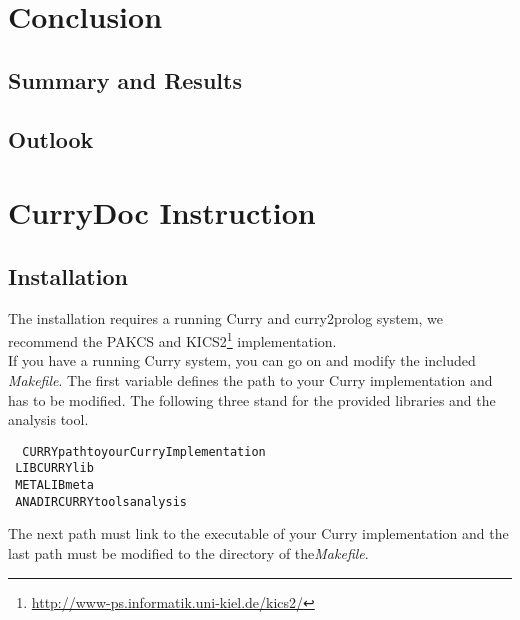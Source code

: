 \documentclass[%
	latex,%
	a4paper,%
	oneside,%
	chapterprefix,%
	headsepline,%
	12pt%
]{scrbook}
\begin{document}
\chapter{Conclusion}\label{conclusion}
\section{Summary and Results}
\section{Outlook}

\newpage
{}
\setcounter{page}{\value{roemisch}}

\appendix
\chapter{CurryDoc Instruction}\label{currydoc}
\section{Installation}

The installation requires a running Curry and curry2prolog system, we
recommend the PAKCS and
KICS2\footnote{\url{http://www-ps.informatik.uni-kiel.de/kics2/}}
implementation. \\

If you have a running Curry system, you can go on and modify the
included \emph{Makefile}. %
The first variable defines the path to your Curry implementation and
has to be modified. %
The following three stand for the provided libraries and the analysis
tool. %

\begin{tabbing}\tt
~CURRYpathtoyourCurryImplementation\\
\tt ~LIBCURRYlib\\
\tt ~METALIBmeta\\
\tt ~ANADIRCURRYtoolsanalysis
\end{tabbing}

The next path must link to the executable of your Curry implementation
and the last path must be modified to the directory of
the\emph{Makefile}.
\end{document}
